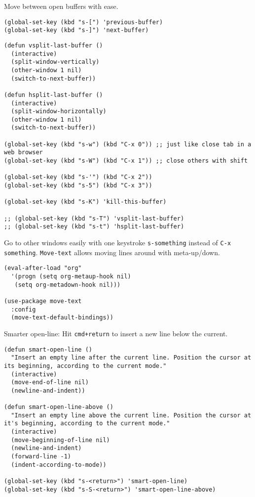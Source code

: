 \documentclass[11pt]{article}
\begin{document}
Move between open buffers with ease.

\begin{verbatim}
(global-set-key (kbd "s-[") 'previous-buffer)
(global-set-key (kbd "s-]") 'next-buffer)
\end{verbatim}

\begin{verbatim}
(defun vsplit-last-buffer ()
  (interactive)
  (split-window-vertically)
  (other-window 1 nil)
  (switch-to-next-buffer))

(defun hsplit-last-buffer ()
  (interactive)
  (split-window-horizontally)
  (other-window 1 nil)
  (switch-to-next-buffer))

(global-set-key (kbd "s-w") (kbd "C-x 0")) ;; just like close tab in a web browser
(global-set-key (kbd "s-W") (kbd "C-x 1")) ;; close others with shift

(global-set-key (kbd "s-'") (kbd "C-x 2"))
(global-set-key (kbd "s-5") (kbd "C-x 3"))

(global-set-key (kbd "s-K") 'kill-this-buffer)

;; (global-set-key (kbd "s-T") 'vsplit-last-buffer)
;; (global-set-key (kbd "s-t") 'hsplit-last-buffer)
\end{verbatim}

Go to other windows easily with one keystroke \texttt{s-something} instead of \texttt{C-x something}.
\texttt{Move-text} allows moving lines around with meta-up/down.

\begin{verbatim}
(eval-after-load "org"
  '(progn (setq org-metaup-hook nil)
   (setq org-metadown-hook nil)))

(use-package move-text
  :config
  (move-text-default-bindings))
\end{verbatim}

Smarter open-line: Hit \texttt{cmd+return} to insert a new line below the current.

\begin{verbatim}
(defun smart-open-line ()
  "Insert an empty line after the current line. Position the cursor at its beginning, according to the current mode."
  (interactive)
  (move-end-of-line nil)
  (newline-and-indent))

(defun smart-open-line-above ()
  "Insert an empty line above the current line. Position the cursor at it's beginning, according to the current mode."
  (interactive)
  (move-beginning-of-line nil)
  (newline-and-indent)
  (forward-line -1)
  (indent-according-to-mode))

(global-set-key (kbd "s-<return>") 'smart-open-line)
(global-set-key (kbd "s-S-<return>") 'smart-open-line-above)
\end{verbatim}
\end{document}
